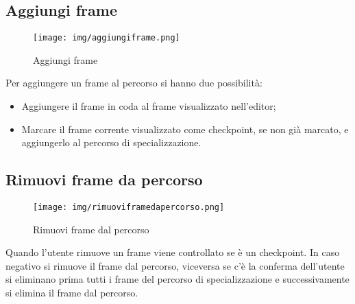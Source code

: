 \subsection{Aggiungi frame}

\begin{figure}[h!]
		\centering
		\texttt{[image: img/aggiungiframe.png]}
		\caption{Aggiungi frame}
		\label{fig:ModelloSpy}
\end{figure}

Per aggiungere un frame al percorso si hanno due possibilità:
\begin{itemize}
\item Aggiungere il frame in coda al frame visualizzato nell'editor;
\item Marcare il frame corrente visualizzato come checkpoint, se non già marcato, e aggiungerlo al percorso di specializzazione.  
\end{itemize}

\subsection{Rimuovi frame da percorso}

\begin{figure}[h!]
		\centering
		\texttt{[image: img/rimuoviframedapercorso.png]}
		\caption{Rimuovi frame dal percorso}
		\label{fig:ModelloSpy}
\end{figure}

Quando l'utente rimuove un frame viene controllato se è un checkpoint. In caso negativo si rimuove il frame dal percorso, viceversa se c'è la conferma dell'utente si eliminano prima tutti i frame del percorso di specializzazione e successivamente si elimina il frame dal percorso. 
